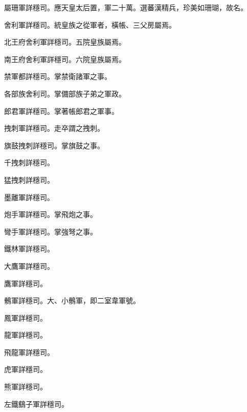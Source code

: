 \begin{pinyinscope}
 屬珊軍詳穩司。應天皇太后置，軍二十萬。選蕃漢精兵，珍美如珊瑚，故名。



 舍利軍詳穩司。統皇族之從軍者，橫帳、三父房屬焉。



 北王府舍利軍詳穩司。五院皇族屬焉。



 南王府舍利軍詳穩司。六院皇族屬焉。



 禁軍都詳穩司。掌禁衛諸軍之事。



 各部族舍利司。掌備部族子弟之軍政。



 郎君軍詳穩司。掌著帳郎君之軍事。



 拽刺軍詳穩司。走卒謂之拽刺。



 旗鼓拽刺詳穩司。掌旗鼓之事。



 千拽刺詳穩司。



 猛拽刺詳穩司。



 墨離軍詳穩司。



 炮手軍詳穩司。掌飛炮之事。



 彎手軍詳穩司。掌強弩之事。



 鐵林軍詳穩司。



 大鷹軍詳穩司。



 鷹軍詳穩司。



 鶻軍詳穩司。大、小鶻軍，即二室韋軍號。



 鳳軍詳穩司。



 龍軍詳穩司。



 飛龍軍詳穩司。



 虎軍詳穩司。



 熊軍詳穩司。



 左鐵鷂子軍詳穩司。




\end{pinyinscope}
